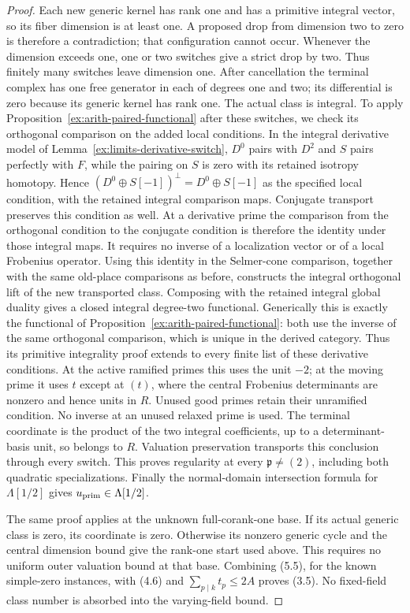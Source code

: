 \documentclass[11pt]{article}
\theoremstyle{definition}
\theoremstyle{remark}
\begin{document}
\begin{proof}
Each new generic kernel has rank one and has a primitive integral
vector, so its fiber dimension is at least one. A proposed drop
from dimension two to zero is therefore a contradiction; that
configuration cannot occur. Whenever the dimension exceeds one,
one or two switches give a strict drop by two. Thus finitely many
switches leave dimension one. After cancellation the terminal
complex has one free generator in each of degrees one and two;
its differential is zero because its generic kernel has rank one.
The actual class is integral. To apply
Proposition~\ref{ex:arith-paired-functional} after these switches,
we check its orthogonal comparison on the added local conditions.
In the integral derivative model of
Lemma~\ref{ex:limits-derivative-switch}, $D^0$ pairs with $D^2$ and
$S$ pairs perfectly with $F$, while the pairing on $S$ is zero
with its retained isotropy homotopy. Hence
$(D^0\oplus S[-1])^\perp=D^0\oplus S[-1]$ as the specified local
condition, with the retained integral comparison maps. Conjugate
transport preserves this condition as well. At a derivative prime
the comparison from the orthogonal condition to the conjugate
condition is therefore the identity under those integral maps.
It requires no inverse of a localization vector or of a local
Frobenius operator. Using this identity in the Selmer-cone comparison,
together with the same old-place comparisons as before, constructs
the integral orthogonal lift of the new transported class. Composing
with the retained integral global duality gives a closed integral
degree-two functional. Generically this is exactly the functional
of Proposition~\ref{ex:arith-paired-functional}: both use the inverse
of the same orthogonal comparison, which is unique in the derived
category. Thus its primitive integrality proof extends to every
finite list of these derivative conditions. At the
active ramified primes this uses the unit $-2$; at the moving prime
it uses $t$ except at $(t)$, where the central Frobenius determinants
are nonzero and hence units in $R$. Unused good primes retain their
unramified condition. No inverse at an unused relaxed prime is used.
The terminal coordinate is the product of the two integral
coefficients, up to a determinant-basis unit, so belongs to $R$.
Valuation preservation transports this conclusion through every
switch. This proves regularity at every $\mathfrak p\ne(2)$,
including both quadratic specializations. Finally the normal-domain
intersection formula for $\Lambda[1/2]$ gives
$u_{\rm prim}\in\Lambda[1/2]$.

The same proof applies at the unknown full-corank-one base. If its
actual generic class is zero, its coordinate is zero. Otherwise its
nonzero generic cycle and the central dimension bound give the
rank-one start used above. This requires no uniform outer valuation
bound at that base. Combining (5.5), for the known simple-zero
instances, with (4.6) and $\sum_{p\mid k}t_p\le2A$ proves (3.5).
No fixed-field class number is absorbed into the varying-field bound.


\end{proof}
\end{document}
